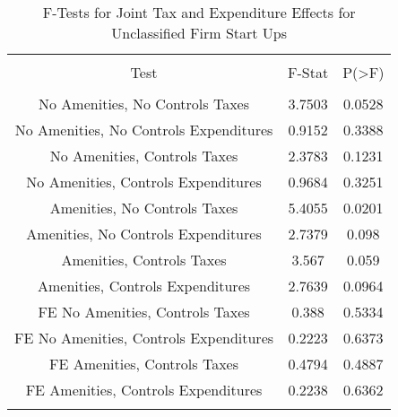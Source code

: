 
\begin{table}[!htbp] \centering 
  \caption{F-Tests for Joint Tax and Expenditure Effects for Unclassified Firm Start Ups} 
  \label{99Ftests} 
\begin{tabular}{@{\extracolsep{5pt}} ccc} 
\\[-1.8ex]\hline 
\hline \\[-1.8ex] 
Test & F-Stat & P(\textgreater F) \\ 
\hline \\[-1.8ex] 
No Amenities, No Controls Taxes & 3.7503 & 0.0528 \\ 
No Amenities, No Controls Expenditures & 0.9152 & 0.3388 \\ 
No Amenities, Controls Taxes & 2.3783 & 0.1231 \\ 
No Amenities, Controls Expenditures & 0.9684 & 0.3251 \\ 
Amenities, No Controls Taxes & 5.4055 & 0.0201 \\ 
Amenities, No Controls Expenditures & 2.7379 & 0.098 \\ 
Amenities, Controls Taxes & 3.567 & 0.059 \\ 
Amenities, Controls Expenditures & 2.7639 & 0.0964 \\ 
FE No Amenities, Controls Taxes & 0.388 & 0.5334 \\ 
FE No Amenities, Controls Expenditures & 0.2223 & 0.6373 \\ 
FE Amenities, Controls Taxes & 0.4794 & 0.4887 \\ 
FE Amenities, Controls Expenditures & 0.2238 & 0.6362 \\ 
\hline \\[-1.8ex] 
\end{tabular} 
\end{table} 
